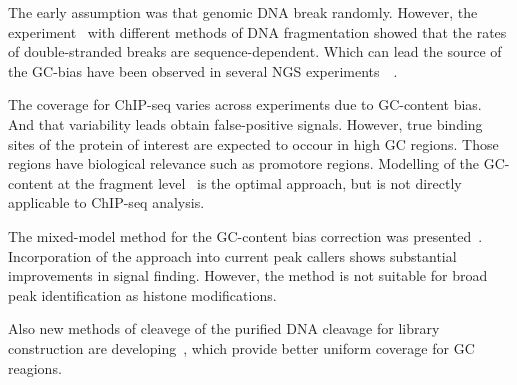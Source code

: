 The early assumption was that genomic DNA break randomly.
However, the experiment~\cite{poptsova2014non} with different methods of DNA fragmentation showed that the rates of double-stranded breaks are sequence-dependent.
Which can lead the source of the GC-bias have been observed in several NGS experiments~\cite{benjamini2012summarizing}~\cite{dohm2008substantial}. 

The coverage for ChIP-seq varies across experiments due to GC-content bias.
And that variability leads obtain false-positive signals.
However, true binding sites of the protein of interest are expected to occour in high GC regions.
Those regions have biological relevance such as promotore regions.
Modelling of the GC-content at the fragment level~\cite{benjamini2012summarizing} is the optimal approach, but is not directly applicable to ChIP-seq analysis.

The mixed-model method for the GC-content bias correction was presented~\cite{teng2017accounting}.
Incorporation of the approach into current peak callers shows substantial improvements in signal finding.
However, the method is not suitable for broad peak identification as histone modifications.

Also new methods of cleavege of the purified DNA cleavage for library construction are developing~\cite{}, which provide better uniform coverage for GC reagions.






